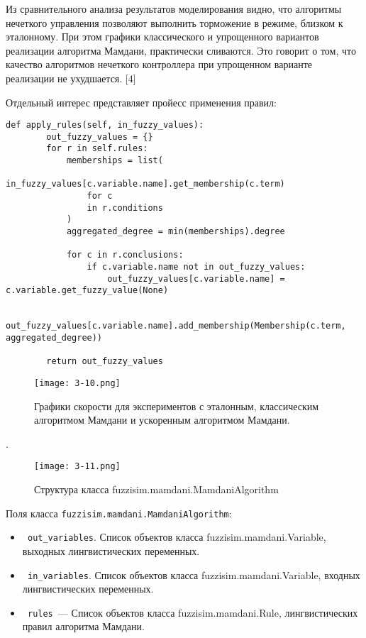 Из сравнительного анализа результатов моделирования  видно, что алгоритмы нечеткого управления позволяют выполнить торможение в режиме, близком к эталонному. При этом графики классического и упрощенного вариантов реализации алгоритма Мамдани,
практически сливаются. Это говорит о том, что качество алгоритмов нечеткого контроллера при упрощенном варианте реализации не ухудшается. [4]

Отдельный интерес представляет пройесс применения правил:

\begin{lstlisting}[style=pythonstyle,caption={  }, label=lst:func:1]
	def apply_rules(self, in_fuzzy_values):
		out_fuzzy_values = {}
		for r in self.rules:
			memberships = list(
				in_fuzzy_values[c.variable.name].get_membership(c.term)
				for c
				in r.conditions
			)
			aggregated_degree = min(memberships).degree

			for c in r.conclusions:
				if c.variable.name not in out_fuzzy_values:
					out_fuzzy_values[c.variable.name] = c.variable.get_fuzzy_value(None)

				out_fuzzy_values[c.variable.name].add_membership(Membership(c.term, aggregated_degree))

		return out_fuzzy_values
\end{lstlisting}

\begin{figure}[ht]
	\centering
	\texttt{[image: 3-10.png]}
	\caption{ Графики скорости для экспериментов с эталонным, классическим алгоритмом Мамдани и ускоренным алгоритмом Мамдани. }
\end{figure}

.

\begin{figure}[ht]
	\centering
	\texttt{[image: 3-11.png]}
	\caption{ Структура класса fuzzisim.mamdani.MamdaniAlgorithm}
\end{figure}

Поля класса \lstinline!fuzzisim.mamdani.MamdaniAlgorithm!:
\begin{itemize}
	\item \lstinline! out_variables!. Список объектов класса fuzzisim.mamdani.Variable, выходных лингвистических переменных.
	\item \lstinline! in_variables!.  Список объектов класса fuzzisim.mamdani.Variable, входных лингвистических переменных.
	\item \lstinline! rules !— Список объектов класса fuzzisim.mamdani.Rule, лингвистических правил алгоритма Мамдани.
\end{itemize}


